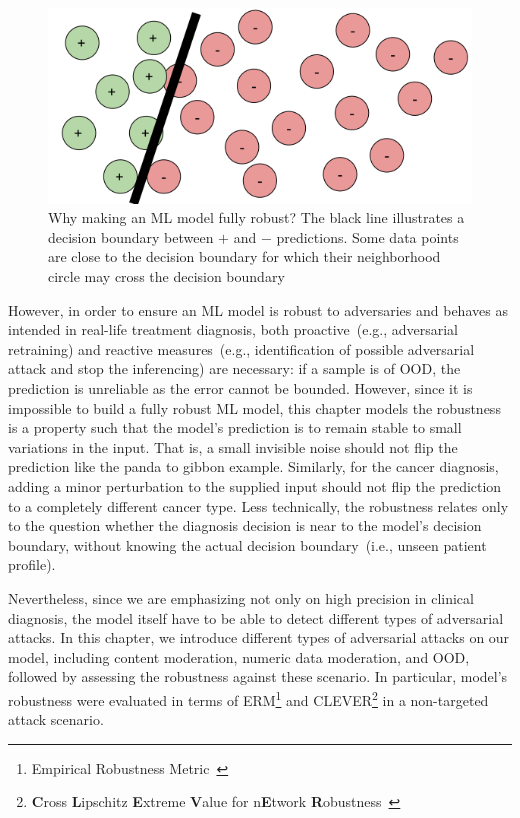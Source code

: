 \begin{figure}
    \centering
    \includegraphics[scale=0.5]{images/db_1.png}
    \caption[Robustness is difficult to interpret]{Why making an ML model fully robust? The black line illustrates a decision boundary between $+$ and $-$ predictions. Some data points are close to the decision boundary for which their neighborhood circle may cross the decision boundary~\cite{RobustnessNotEnough}}
    \label{fig:db_example}
    \vspace{-4mm}
\end{figure}

\hspace*{3.5mm} However, in order to ensure an ML model is robust to adversaries and behaves as intended in real-life treatment diagnosis, both proactive~(e.g., adversarial retraining) and reactive measures~(e.g., identification of possible adversarial attack and stop the inferencing) are necessary: if a sample is of OOD, the prediction is unreliable as the error cannot be bounded. However, since it is impossible to build a fully robust ML model, this chapter models the robustness is a property such that the model’s prediction is to remain stable to small variations in the input. That is, a small invisible noise should not flip the prediction like the panda to gibbon example. 
Similarly, for the cancer diagnosis, adding a minor perturbation to the supplied input should not flip the prediction to a completely different cancer type. Less technically, the robustness relates only to the question whether the diagnosis decision is near to the model’s decision boundary, without knowing the actual decision boundary~(i.e., unseen patient profile).

\hspace*{3.5mm} Nevertheless, since we are emphasizing not only on high precision in clinical diagnosis, the model itself have to be able to detect different types of adversarial attacks. %
In this chapter, we introduce different types of adversarial attacks on our model, including content moderation, numeric data moderation, and OOD, followed by assessing the robustness against these scenario.
In particular, model's robustness were evaluated in terms of ERM\footnote{Empirical Robustness Metric~\cite{moosavi2016deepfool}} and  CLEVER\footnote{\textbf{C}ross \textbf{L}ipschitz \textbf{E}xtreme \textbf{V}alue for n\textbf{E}twork \textbf{R}obustness~\cite{weng2018evaluating}} in a non-targeted attack scenario. 

